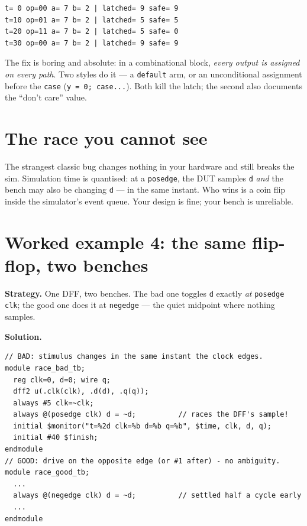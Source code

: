 \begin{lstlisting}[caption={Real run. Notice \texttt{op=11} at t=20:
the latched ALU answers 5 --- a \emph{memory} of the subtraction ---
while the safe one answers 0. The latch is not a bug you see; it is a
bug that sees you.},abovecaptionskip=0pt,label={lst:caselatchout}]
t= 0 op=00 a= 7 b= 2 | latched= 9 safe= 9
t=10 op=01 a= 7 b= 2 | latched= 5 safe= 5
t=20 op=11 a= 7 b= 2 | latched= 5 safe= 0
t=30 op=00 a= 7 b= 2 | latched= 9 safe= 9
\end{lstlisting}

The fix is boring and absolute: in a
combinational block, \emph{every output is assigned on every path}.
Two styles do it --- a \texttt{default} arm, or an unconditional
assignment before the \texttt{case} (\texttt{y = 0; case...}). Both
kill the latch; the second also documents the ``don't care'' value.

\section{The race you cannot see}\label{sec:race}

The strangest classic bug changes
nothing in your hardware and still breaks the sim. Simulation time is
quantised: at a \texttt{posedge}, the DUT samples \texttt{d}
\emph{and} the bench may also be changing \texttt{d} --- in the same
instant. Who wins is a coin flip inside the simulator's event queue.
Your design is fine; your bench is unreliable.

\section{Worked example 4: the same flip-flop, two benches}
\label{sec:we-race}

\textbf{Strategy.} One DFF, two benches. The bad one toggles
\texttt{d} exactly \emph{at} \texttt{posedge clk}; the good one does
it at \texttt{negedge} --- the quiet midpoint where nothing samples.

\textbf{Solution.}
\begin{lstlisting}[caption={\ttfamily code/ch12\_race\_tb.v
(abridged) --- one line differs.},label={lst:race}]
// BAD: stimulus changes in the same instant the clock edges.
module race_bad_tb;
  reg clk=0, d=0; wire q;
  dff2 u(.clk(clk), .d(d), .q(q));
  always #5 clk=~clk;
  always @(posedge clk) d = ~d;          // races the DFF's sample!
  initial $monitor("t=%2d clk=%b d=%b q=%b", $time, clk, d, q);
  initial #40 $finish;
endmodule
// GOOD: drive on the opposite edge (or #1 after) - no ambiguity.
module race_good_tb;
  ...
  always @(negedge clk) d = ~d;          // settled half a cycle early
  ...
endmodule
\end{lstlisting}

